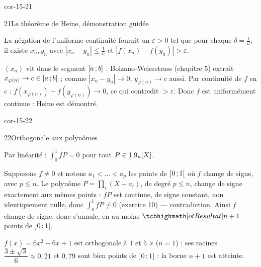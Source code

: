 \begin{blocLivre}{cor-15-21}
\begin{corrige}{21}{Le théorème de Heine, démonstration guidée}
\begin{questions}
  \item La négation de l'uniforme continuité fournit un $\varepsilon>0$
    tel que pour chaque $\delta=\frac1n$, il existe $x_n,y_n$ avec
    $|x_n-y_n|\leqslant\frac1n$ et $|f(x_n)-f(y_n)|>\varepsilon$.
  \item $(x_n)$ vit dans le segment $\mathopen{[}a\,{;}\,b\mathclose{]}$ : Bolzano-Weierstrass
    (chapitre 5) extrait $x_{\varphi(n)}\to c\in\mathopen{[}a\,{;}\,b\mathclose{]}$ ; comme
    $|x_n-y_n|\to0$, $y_{\varphi(n)}\to c$ aussi. Par continuité de $f$
    en $c$ : $f(x_{\varphi(n)})-f(y_{\varphi(n)})\to0$, ce qui contredit
    $>\varepsilon$. Donc $f$ est uniformément continue : Heine est
    démontré.
\end{questions}
\end{corrige}
\end{blocLivre}

\begin{blocLivre}{cor-15-22}
\begin{corrige}{22}{Orthogonale aux polynômes}
\begin{questions}
  \item Par linéarité : $\displaystyle\int_{0}^{1}fP=0$ pour tout
    $P\in1.9_n[X]$.
  \item Supposons $f\neq0$ et notons $a_1<\dots<a_p$ les points de
    $\mathopen{]}0\,{;}\,1\mathclose{[}$ où $f$ change de signe, avec $p\leqslant n$. Le
    polynôme $P=\prod_{i}(X-a_i)$, de degré $p\leqslant n$, change de
    signe exactement aux mêmes points : $fP$ est continue, de signe
    constant, non identiquement nulle, donc
    $\displaystyle\int_{0}^{1}fP\neq0$ (exercice 10) — contradiction.
    Ainsi $f$ change de signe, donc s'annule, en au moins
    $\res{n+1}$ points de $\mathopen{]}0\,{;}\,1\mathclose{[}$.
  \item $f(x)=6x^{2}-6x+1$ est orthogonale à $1$ et à $x$ ($n=1$) ; ses
    racines $\dfrac{3\pm\sqrt3}{6}\approx0{,}21$ et $0{,}79$ sont bien
     points de $\mathopen{]}0\,{;}\,1\mathclose{[}$ : la borne $n+1$ est
    atteinte.
\end{questions}
\end{corrige}
\end{blocLivre}

